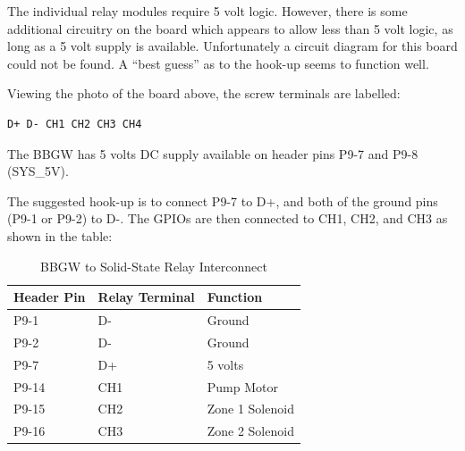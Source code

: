 The individual relay modules require 5 volt logic.  However, there is some 
additional circuitry on the board which appears to allow less than 5 volt 
logic, as long as a 5 volt supply is available.  Unfortunately a circuit 
diagram for this board could not be found.  A ``best guess'' as to the hook-up 
seems to function well.

Viewing the photo of the board above, the screw terminals are labelled:

\begin{verbatim}
D+ D- CH1 CH2 CH3 CH4
\end{verbatim}

The BBGW has 5 volts DC supply available on header pins P9-7 and P9-8 (SYS\_5V).

The suggested hook-up is to connect P9-7 to D+, and both of the ground pins 
(P9-1 or P9-2) to D-.  The GPIOs are then connected to CH1, CH2, and CH3 as 
shown in the table:

\begin{longtable}{lll}
\caption{BBGW to Solid-State Relay Interconnect}\\
\toprule
Header Pin & Relay Terminal & Function \\\midrule
P9-1 & D- & Ground \\
P9-2 & D- & Ground \\
P9-7 & D+ & 5 volts \\
P9-14 & CH1 & Pump Motor \\
P9-15 & CH2 & Zone 1 Solenoid \\
P9-16 & CH3 & Zone 2 Solenoid
\end{longtable}

